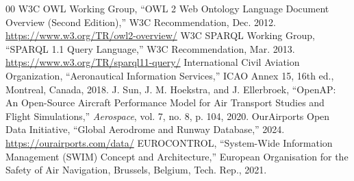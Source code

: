 \documentclass[conference]{IEEEtran}
\begin{document}
\begin{thebibliography}{00}
 W3C OWL Working Group, ``OWL 2 Web Ontology Language Document Overview (Second Edition),'' W3C Recommendation, Dec. 2012. \url{https://www.w3.org/TR/owl2-overview/}
 W3C SPARQL Working Group, ``SPARQL 1.1 Query Language,'' W3C Recommendation, Mar. 2013. \url{https://www.w3.org/TR/sparql11-query/}
 International Civil Aviation Organization, ``Aeronautical Information Services,'' ICAO Annex 15, 16th ed., Montreal, Canada, 2018.
 J. Sun, J. M. Hoekstra, and J. Ellerbroek, ``OpenAP: An Open-Source Aircraft Performance Model for Air Transport Studies and Flight Simulations,'' \textit{Aerospace}, vol. 7, no. 8, p. 104, 2020.
 OurAirports Open Data Initiative, ``Global Aerodrome and Runway Database,'' 2024. \url{https://ourairports.com/data/}
 EUROCONTROL, ``System-Wide Information Management (SWIM) Concept and Architecture,'' European Organisation for the Safety of Air Navigation, Brussels, Belgium, Tech. Rep., 2021.
\end{thebibliography}
\end{document}
